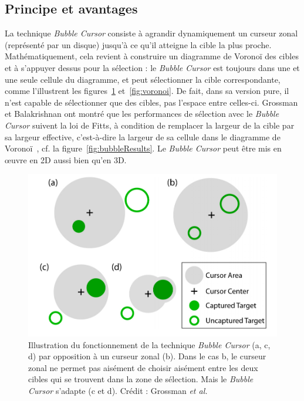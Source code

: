 	\subsection{Principe et avantages}
	La technique \emph{Bubble Cursor} consiste à agrandir dynamiquement un curseur zonal (représenté par un disque) jusqu'à ce qu'il atteigne la cible la plus proche. Mathématiquement, cela revient à construire un diagramme de Voronoï des cibles et à s'appuyer dessus pour la sélection : le \emph{Bubble Cursor} est toujours dans une et une seule cellule du diagramme, et peut sélectionner la cible correspondante, comme l'illustrent les figures~\ref{fig:bubble} et~\ref{fig:voronoi}. De fait, dans sa version pure, il n'est capable de sélectionner que des cibles, pas l'espace entre celles-ci. Grossman et Balakrishnan ont montré que les performances de sélection avec le \emph{Bubble Cursor} suivent la loi de Fitts, à condition de remplacer la largeur de la cible par sa largeur effective, c'est-à-dire la largeur de sa cellule dans le diagramme de Voronoï~\cite{grossman2005bubble}, cf. la figure~\ref{fig:bubbleResults}. Le \emph{Bubble Cursor} peut être mis en œuvre en 2D aussi bien qu'en 3D.
		
	\begin{figure}[ht]
		\centering
		\includegraphics[width=\textwidth]{figures/bubble}
		\caption{Illustration du fonctionnement de la technique \emph{Bubble Cursor} (a, c, d) par opposition à un curseur zonal (b). Dans le cas b, le curseur zonal ne permet pas aisément de choisir aisément entre les deux cibles qui se trouvent dans la zone de sélection. Mais le \emph{Bubble Cursor} s'adapte (c et d). Crédit : Grossman \emph{et al.}}
		\label{fig:bubble}
	\end{figure}
	

